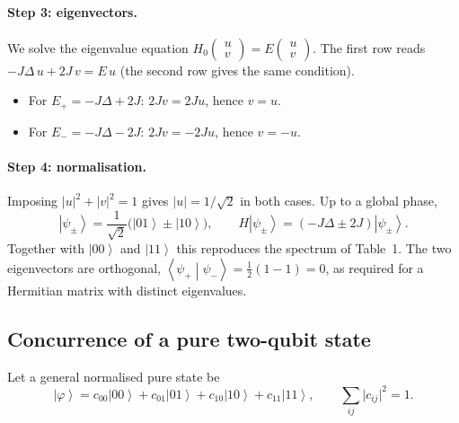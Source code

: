 \documentclass[11pt,a4paper]{article}
\newcommand{\ket}[1]{\left|#1\right\rangle}
\newcommand{\braket}[2]{\left\langle #1\middle|#2\right\rangle}
\begin{document}
\paragraph{Step 3: eigenvectors.}
We solve the eigenvalue equation $H_0\begin{pmatrix}u\\v\end{pmatrix}=E\begin{pmatrix}u\\v\end{pmatrix}$. The first row reads $-J\Delta\,u+2J\,v=E\,u$ (the second row gives the same condition).
\begin{itemize}
  \item For $E_+=-J\Delta+2J$: $2Jv=2Ju$, hence $v=u$.
  \item For $E_-=-J\Delta-2J$: $2Jv=-2Ju$, hence $v=-u$.
\end{itemize}

\paragraph{Step 4: normalisation.}
Imposing $\lvert u\rvert^2+\lvert v\rvert^2=1$ gives $\lvert u\rvert=1/\sqrt2$ in both cases. Up to a global phase,
\begin{equation}
  \ket{\psi_\pm}=\frac{1}{\sqrt2}\bigl(\ket{01}\pm\ket{10}\bigr),\qquad H\ket{\psi_\pm}=(-J\Delta\pm2J)\ket{\psi_\pm}.
\end{equation}
Together with $\ket{00}$ and $\ket{11}$ this reproduces the spectrum of Table~1. The two eigenvectors are orthogonal, $\braket{\psi_+}{\psi_-}=\tfrac12(1-1)=0$, as required for a Hermitian matrix with distinct eigenvalues.

\subsection{Concurrence of a pure two-qubit state}

Let a general normalised pure state be
\begin{equation}
  \ket{\varphi}=c_{00}\ket{00}+c_{01}\ket{01}+c_{10}\ket{10}+c_{11}\ket{11},\qquad \sum_{ij}\lvert c_{ij}\rvert^2=1 .
\end{equation}
\end{document}

